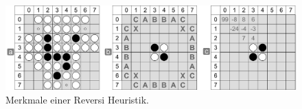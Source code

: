 \begin{figure}[!htbp]
  \centering
  \includegraphics[scale = 0.4]{inhalt/abbildungen/reversi_movement_notation_positioning.pdf}
  \caption{Merkmale einer Reversi Heuristik.}
  \label{fig:reversi_movement_notation_positioning}
\end{figure}
